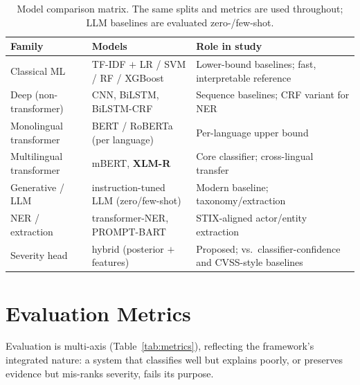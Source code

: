 \documentclass[11pt,a4paper]{article}
\begin{document}
\begin{table}[t]
\centering
\caption{Model comparison matrix. The same splits and metrics are used throughout; LLM
baselines are evaluated zero-/few-shot.}
\label{tab:models}
\small
\begin{tabular}{@{}p{3.1cm}p{4.0cm}p{5.4cm}@{}}
\toprule
\textbf{Family} & \textbf{Models} & \textbf{Role in study} \\
\midrule
Classical ML & TF-IDF $+$ LR / SVM / RF / XGBoost & Lower-bound baselines; fast, interpretable reference \\
Deep (non-transformer) & CNN, BiLSTM, BiLSTM-CRF & Sequence baselines; CRF variant for NER~\cite{kim2020automatic} \\
Monolingual transformer & BERT / RoBERTa (per language) & Per-language upper bound~\cite{sangher2023towards} \\
Multilingual transformer & mBERT, \textbf{XLM-R} & Core classifier; cross-lingual transfer~\cite{conneau2020xlmr,thangaraj2024crosslingual} \\
Generative / LLM & instruction-tuned LLM (zero/few-shot) & Modern baseline; taxonomy/extraction~\cite{shah2025madcti,demarcos2026llm,sorokoletova2024scalable} \\
NER / extraction & transformer-NER, PROMPT-BART & STIX-aligned actor/entity extraction~\cite{evangelatos2021ner,feng2025promptbart,echchammakhy2025cyberner} \\
Severity head & hybrid (posterior $+$ features) & Proposed; vs.\ classifier-confidence and CVSS-style baselines~\cite{zeng2022licality,saklani2025severity} \\
\bottomrule
\end{tabular}
\end{table}

\section{Evaluation Metrics}\label{sec:metrics}

Evaluation is multi-axis (Table~\ref{tab:metrics}), reflecting the framework's
integrated nature: a system that classifies well but explains poorly, or preserves
evidence but mis-ranks severity, fails its purpose.
\end{document}
